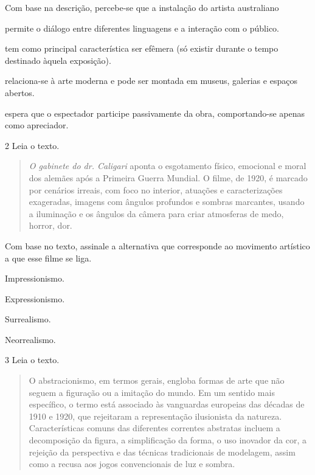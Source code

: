 Com base na descrição, percebe-se que a instalação do artista australiano

\begin{escolha}
\item
  permite o diálogo entre diferentes linguagens e a interação com o
  público.
\item
  tem como principal característica ser efêmera (só existir durante o
  tempo destinado àquela exposição).
\item
  relaciona-se à arte moderna e pode ser montada em museus, galerias e
  espaços abertos.
\item
  espera que o espectador participe passivamente da obra, comportando-se apenas como
  apreciador.
\end{escolha}

\num{2} Leia o texto.

\begin{quote}
\emph{O gabinete do dr. Caligari} aponta o esgotamento físico, emocional e moral dos alemães após a Primeira Guerra Mundial. O filme, de 1920, é marcado por
cenários irreais, com foco no interior, atuações e caracterizações
exageradas, imagens com ângulos profundos e sombras marcantes, usando a
iluminação e os ângulos da câmera para criar atmosferas de medo, horror,
dor.

\end{quote}

Com base no texto, assinale a alternativa que corresponde ao movimento artístico a que esse filme se liga.

\begin{escolha}
\item
  Impressionismo.
\item
  Expressionismo.
\item
  Surrealismo.
\item
  Neorrealismo.
\end{escolha}

\num{3}  Leia o texto.

\begin{quote}
O abstracionismo, em termos gerais, engloba formas de arte que não seguem a figuração ou a imitação do mundo. Em um sentido mais específico, o termo está associado às vanguardas europeias das décadas de 1910 e 1920, que rejeitaram a representação ilusionista da natureza. Características comuns das diferentes correntes abstratas incluem a decomposição da figura, a simplificação da forma, o uso inovador da cor, a rejeição da perspectiva e das técnicas tradicionais de modelagem, assim como a recusa aos jogos convencionais de luz e sombra.

\end{quote}

